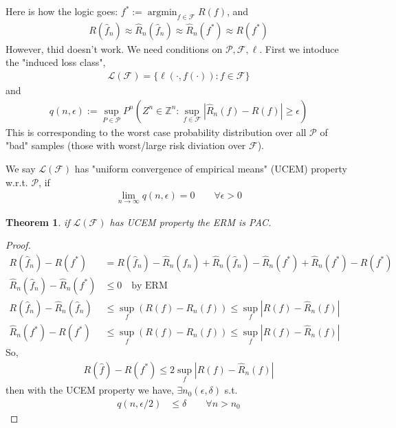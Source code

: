 \documentclass[10pt]{article}
\newcounter{lecnum}
\newtheorem{theorem}{Theorem}[lecnum]
\DeclareMathOperator*{\argmin}{argmin}
\renewcommand{\hat}{\widehat}
\begin{document}
Here is how the logic goes: $f^* := \argmin_{f\in \mathcal F} R(f)$, and\\
\begin{align*}
R(\hat f_n) \approx \hat R_n(\hat f_n) \approx
\hat R_n(f^*) \approx R(f^*)
\end{align*}
However, thid doesn't work. We need conditions on $\mathcal{P}, \mathcal{F}, \ell$. First we intoduce the "induced loss class",
\begin{align*}
\mathcal{L}(\mathcal{F})=\{\ell(\cdot, f(\cdot)) : f \in \mathcal{F}\}
\end{align*}
and
\begin{align*}
q(n, \epsilon) := \sup_{P \in \mathcal{P}} P^n ( Z^n \in \mathbb{Z}^n: \sup_{f\in\mathcal{F}}|\hat R_n(f) - R(f)| \ge \epsilon)
\end{align*}
This is corresponding to the worst case probability distribution over all $\mathcal{P}$ of "bad" samples (those with worst/large risk diviation over $\mathcal{F}$).

We say $\mathcal{L}(\mathcal{F})$ has "uniform convergence of empirical means" (UCEM) property w.r.t. $\mathcal{P}$, if
\begin{align*}
\lim_{n\rightarrow\infty} q(n,\epsilon) = 0 \qquad \forall \epsilon > 0
\end{align*}

\begin{theorem}
if $\mathcal{L}(\mathcal{F})$ has UCEM property the ERM is PAC.
\end{theorem}

\begin{proof}
\begin{align*}
R(\hat f_n) - R(f^*) &= R(\hat f_n) - \hat R_n(\hat f_n) + \hat R_n(\hat f_n) - \hat R_n(f^*) + \hat R_n(f^*) - R(f^*)\\
\hat R_n(\hat f_n) - \hat R_n(f^*) &\le 0 \quad \text{by ERM}\\
R(\hat f_n) - \hat R_n(\hat f_n) &\le \sup_f ( R(f) - R_n(f)) \le \sup_f | R(f) - \hat R_n(f) |\\
\hat R_n(f^*) - R(f^*) &\le \sup_f ( R(f) - R_n(f)) \le \sup_f | R(f) - \hat R_n(f) |
\end{align*}
So, 
\begin{align*}
R(\hat f) - R(f^*) \le 2 \sup_f | R(f) - \hat R_n (f) |
\end{align*}
then with the UCEM property we have, $\exists n_0 (\epsilon, \delta)$ s.t.
\begin{align*}
q(n, \epsilon / 2) &\le \delta \qquad \forall n > n_0
\end{align*}
\end{proof}
\end{document}

